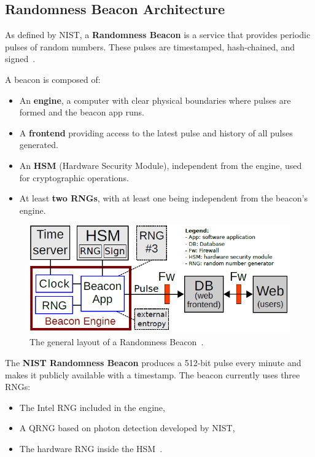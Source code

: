 \subsection{Randomness Beacon Architecture}

As defined by NIST, a \textbf{Randomness Beacon} is a service that provides periodic pulses of random numbers. These pulses are timestamped, hash-chained, and signed~\cite{kelsey2019}.

A beacon is composed of:
\begin{itemize}
    \item An \textbf{engine}, a computer with clear physical boundaries where pulses are formed and the beacon app runs.
    \item A \textbf{frontend} providing access to the latest pulse and history of all pulses generated.
    \item An \textbf{HSM} (Hardware Security Module), independent from the engine, used for cryptographic operations.
    \item At least \textbf{two RNGs}, with at least one being independent from the beacon's engine.
\end{itemize}

\begin{figure}[h]
    \centering
    \includegraphics[width=\columnwidth]{images/ArchitectureNISTBeacon.PNG}
    \caption{The general layout of a Randomness Beacon~\cite{kelsey2019}.}
    \label{fig:beacon-architecture}
\end{figure}

The \textbf{NIST Randomness Beacon} produces a 512-bit pulse every minute and makes it publicly available with a timestamp. The beacon currently uses three RNGs:
\begin{itemize}
    \item The Intel RNG included in the engine,
    \item A QRNG based on photon detection developed by NIST,
    \item The hardware RNG inside the HSM~\cite{kelsey2018}.
\end{itemize}

